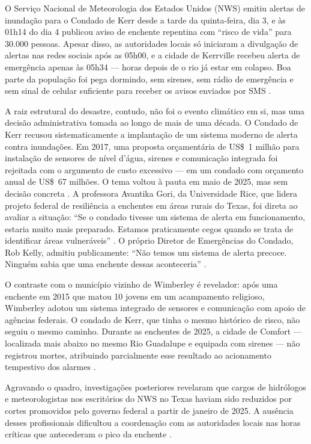 O Serviço Nacional de Meteorologia dos Estados Unidos (NWS) emitiu alertas
de inundação para o Condado de Kerr desde a tarde da quinta-feira, dia 3, e
às 01h14 do dia 4 publicou aviso de enchente repentina com ``risco de vida''
para 30.000 pessoas. Apesar disso, as autoridades locais só iniciaram a
divulgação de alertas nas redes sociais após as 05h00, e a cidade de Kerrville
recebeu alerta de emergência apenas às 05h34 --- horas depois de o rio já
estar em colapso. Boa parte da população foi pega dormindo, sem sirenes,
sem rádio de emergência e sem sinal de celular suficiente para receber os
avisos enviados por SMS \cite{globo2025texas, horadopovo2025texas,
cnnbrasil2025texas}.

A raiz estrutural do desastre, contudo, não foi o evento climático em si, mas
uma decisão administrativa tomada ao longo de mais de uma década. O
Condado de Kerr recusou sistematicamente a implantação de um sistema
moderno de alerta contra inundações. Em 2017, uma proposta orçamentária
de US\$~1 milhão para instalação de sensores de nível d'água, sirenes e
comunicação integrada foi rejeitada com o argumento de custo excessivo ---
em um condado com orçamento anual de US\$~67 milhões. O tema voltou à
pauta em maio de 2025, mas sem decisão concreta \cite{metsul2025texas}.
A professora Avantika Gori, da Universidade Rice, que lidera projeto federal
de resiliência a enchentes em áreas rurais do Texas, foi direta ao avaliar a
situação: ``Se o condado tivesse um sistema de alerta em funcionamento,
estaria muito mais preparado. Estamos praticamente cegos quando se trata
de identificar áreas vulneráveis'' \cite{metsul2025texas}. O próprio Diretor de
Emergências do Condado, Rob Kelly, admitiu publicamente: ``Não temos um
sistema de alerta precoce. Ninguém sabia que uma enchente dessas
aconteceria'' \cite{horadopovo2025texas}.

O contraste com o município vizinho de Wimberley é revelador: após uma
enchente em 2015 que matou 10 jovens em um acampamento religioso,
Wimberley adotou um sistema integrado de sensores e comunicação com apoio
de agências federais. O condado de Kerr, que tinha o mesmo histórico de risco,
não seguiu o mesmo caminho. Durante as enchentes de 2025, a cidade de
Comfort --- localizada mais abaixo no mesmo Rio Guadalupe e equipada com
sirenes --- não registrou mortes, atribuindo parcialmente esse resultado ao
acionamento tempestivo dos alarmes \cite{metsul2025texas}.

Agravando o quadro, investigações posteriores revelaram que cargos de
hidrólogos e meteorologistas nos escritórios do NWS no Texas haviam sido
reduzidos por cortes promovidos pelo governo federal a partir de janeiro de
2025. A ausência desses profissionais dificultou a coordenação com as
autoridades locais nas horas críticas que antecederam o pico da enchente
\cite{bbc2025texas, globo2025texas}.

